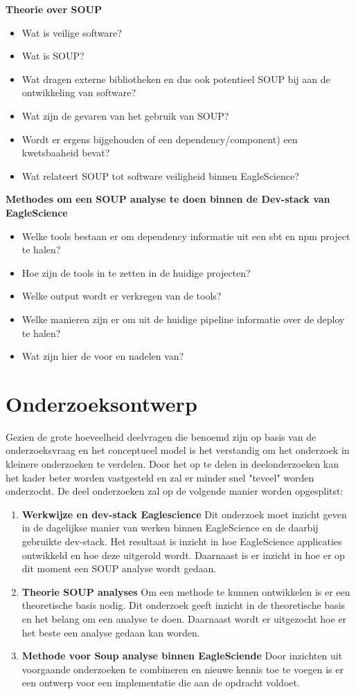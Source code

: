 \textbf{Theorie over SOUP}
\begin{itemize}
    \item Wat is veilige software?
    \item Wat is SOUP?
    \item Wat dragen externe bibliotheken en dus ook potentieel SOUP bij aan de ontwikkeling van software?
    \item Wat zijn de gevaren van het gebruik van SOUP?
    \item Wordt er ergens bijgehouden of een dependency/component) een kwetsbaaheid bevat?
    \item Wat relateert SOUP tot software veiligheid binnen EagleScience?
\end{itemize}


\textbf{Methodes om een SOUP analyse te doen binnen de Dev-stack van EagleScience}
\begin{itemize}
    \item Welke tools bestaan er om dependency informatie uit een sbt en npm project te halen?
    \item Hoe zijn de tools in te zetten in de huidige projecten?
    \item Welke output wordt er verkregen van de tools?
    \item Welke manieren zijn er om uit de huidige pipeline informatie over de deploy te halen?
    \item Wat zijn hier de voor en nadelen van?
\end{itemize}


\section{Onderzoeksontwerp}\label{sec:onderzoeksontwerp}
Gezien de grote hoeveelheid deelvragen die benoemd zijn op basis van de onderzoeksvraag en het conceptueel model is het verstandig om het onderzoek in kleinere onderzoeken te verdelen. Door het op te delen in deelonderzoeken kan het kader beter worden vastgesteld en zal er minder snel "teveel" worden onderzocht. De deel onderzoeken zal op de volgende manier worden opgesplitst:
\begin{enumerate}
    \item \textbf{Werkwijze en dev-stack Eaglescience} Dit onderzoek moet inzicht geven in de dagelijkse manier van werken binnen EagleScience en de daarbij gebruikte dev-stack. Het resultaat is inzicht in hoe EagleScience applicaties ontwikkeld en hoe deze uitgerold wordt. Daarnaast is er inzicht in hoe er op dit moment een SOUP analyse wordt gedaan.
    \item \textbf{Theorie SOUP analyses} Om een methode te kunnen ontwikkelen is er een theoretische basis nodig. Dit onderzoek geeft inzicht in de theoretische basis en het belang om een analyse te doen. Daarnaast wordt er uitgezocht hoe er het beste een analyse gedaan kan worden.
    \item \textbf{Methode voor Soup analyse binnen EagleSciende} Door inzichten uit voorgaande onderzoeken te combineren en nieuwe kennis toe te voegen is er een ontwerp voor een implementatie die aan de opdracht voldoet.
\end{enumerate}

